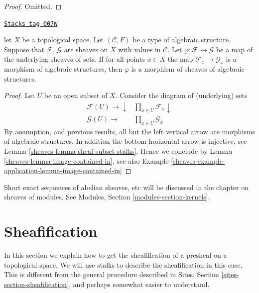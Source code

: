 \begin{proof}
Omitted.
\end{proof}


\begin{lemma}
\label{sheaves-lemma-check-homomorphism-stalks}
\href{https://stacks.math.columbia.edu/tag/007W}{\texttt{Stacks tag 007W}}

let $X$ be a topological space.
Let $(\mathcal{C}, F)$ be a type of algebraic structure.
Suppose that $\mathcal{F}$, $\mathcal{G}$ are sheaves on $X$
with values in $\mathcal{C}$.
Let $\varphi : \mathcal{F} \to \mathcal{G}$
be a map of the underlying sheaves of sets.
If for all points $x \in X$ the map
$\mathcal{F}_x \to \mathcal{G}_x$
is a morphism of algebraic structures,
then $\varphi$ is a morphism of sheaves of algebraic structures.
\end{lemma}

\begin{proof}

Let $U$ be an open subset of $X$. Consider the diagram of
(underlying) sets
$$
\begin{array}{cc}\mathcal{F}(U) \longrightarrow\downarrow & \prod_{x \in U} \mathcal{F}_x \downarrow \\ \mathcal{G}(U) \longrightarrow & \prod_{x \in U} \mathcal{G}_x\end{array}
$$
By assumption, and previous results, all but the left vertical
arrow are morphisms of algebraic structures. In addition the
bottom horizontal arrow is injective,
see Lemma \ref{sheaves-lemma-sheaf-subset-stalks}.
Hence we conclude by Lemma \ref{sheaves-lemma-image-contained-in},
see also Example \ref{sheaves-example-application-lemma-image-contained-in}
\end{proof}

Short exact sequences of abelian sheaves, etc will be discussed
in the chapter on sheaves of modules. See
Modules, Section \ref{modules-section-kernels}.

\section{Sheafification}
\label{sheaves-section-sheafification}
In this section we explain how to get the sheafification
of a presheaf on a topological space. We will use stalks
to describe the sheafification in this case. This is different
from the general procedure described in Sites, Section
\ref{sites-section-sheafification}, and perhaps somewhat
easier to understand.

